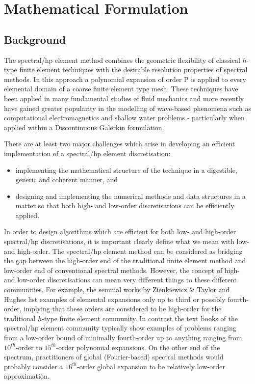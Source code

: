 \chapter{Mathematical Formulation}

\section{Background}

The spectral/hp element method combines the geometric flexibility of classical
$h$-type finite element techniques with the desirable resolution properties of
spectral methods. In this approach a polynomial expansion of order P is applied
to every elemental domain of a coarse finite element type mesh. These techniques
have been applied in many fundamental studies of fluid mechanics \cite{ShKa96}
and more recently have gained greater popularity in the modelling of wave-based phenomena such as computational electromagnetics
\cite{HeWa02} and shallow water problems \cite{BeReCoLeHi09} - particularly when
applied within a Discontinuous Galerkin formulation.

There are at least two major challenges which arise in developing an efficient
implementation of a spectral/hp element discretisation:
\begin{itemize}
\item implementing the mathematical structure of the technique in a digestible,
 generic and coherent manner, and 
\item designing and implementing the numerical methods and data structures in a
 matter so that both high- and low-order discretisations can be efficiently applied.
\end{itemize}

In order to design algorithms which are efficient for both low- and high-order
spectral/hp discretisations, it is important clearly define what we mean with
low- and high-order. The spectral/hp element method can be considered as
bridging the gap between the high-order end of the traditional finite element
method and low-order end of conventional spectral methods. However, the concept
of high- and low-order discretisations can mean very different things to these
different communities. For example, the seminal works by Zienkiewicz \& Taylor
\cite{ZiTa89} and Hughes list examples of elemental expansions only up to
third or possibly fourth-order, implying that these orders are considered to be
high-order for the traditional $h$-type finite element community. In contrast
the text books of the spectral/hp element community typically show examples of
problems ranging from a low-order bound of minimally fourth-order up to anything
ranging from $10^{th}$-order to $15^{th}$-order polynomial
expansions. On the other end of the spectrum, practitioners of global
(Fourier-based) spectral methods \cite{GoOr77} would probably
consider a $16^{th}$-order global expansion to be relatively low-order
approximation.

